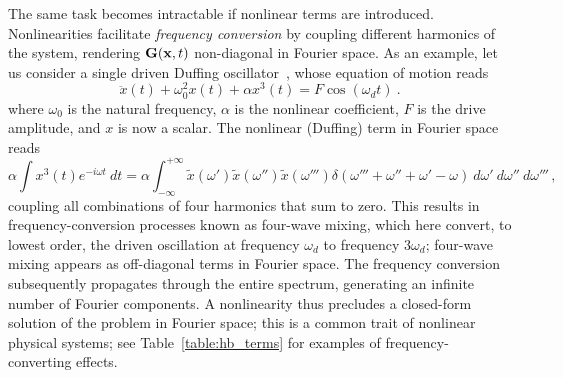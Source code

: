 The same task becomes intractable if nonlinear terms are introduced. Nonlinearities facilitate \textit{frequency conversion} by coupling different harmonics of the system, rendering $\vb{G}(\vb{x},t)$ non-diagonal in Fourier space. As an example, let us consider a single driven Duffing oscillator~\cite{Lifshitz_2008}, whose equation of motion reads
%
\begin{equation} \label{eq:duff_basic}
\ddot{x}(t) + \omega_0^2 x(t) + \alpha x^3(t) = F \cos(\omega_d t) \:.
\end{equation}
%
where $\omega_0$ is the natural frequency, $\alpha$ is the nonlinear coefficient, $F$ is the drive amplitude, and $x$ is now a scalar.
The nonlinear (Duffing) term in Fourier space reads
%
\begin{equation} \label{eq:duffingFT}
\alpha \int x^3(t) e^{-i\omega t} \: dt = \alpha \int_{-\infty}^{+\infty} \tilde{x}(\omega')\tilde{x}(\omega'')\tilde{x}(\omega''') \delta(\omega'''+\omega''+\omega'-\omega) \: d\omega' \: d\omega'' \: d\omega''' \,,
\end{equation}
%
coupling all combinations of four harmonics that sum to zero. This results in frequency-conversion processes known as four-wave mixing, which here convert, to lowest order, the driven oscillation at frequency $\omega_d$ to frequency $3\omega_d$; four-wave mixing appears as off-diagonal terms in Fourier space. The frequency conversion subsequently propagates through the entire spectrum, generating an infinite number of Fourier components. A nonlinearity thus precludes a closed-form solution of the problem in Fourier space; this is a common trait of nonlinear physical systems; see Table~\ref{table:hb_terms} for examples of frequency-converting effects.

